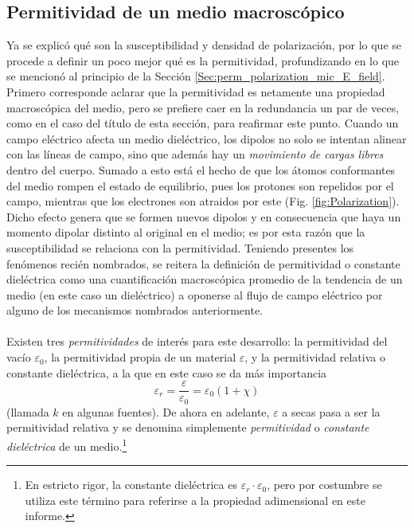 \documentclass[12pt, oneside, numbers, spanish]{ezthesis}
\numberwithin{equation}{section}
\begin{document}
\subsection{Permitividad de un medio macroscópico}\label{subsec:Macro_perm}
Ya se explicó qué son la susceptibilidad y densidad de polarización, por lo que se procede a definir un poco mejor qué es la permitividad, profundizando en lo que se mencionó al principio de la Sección \ref{Sec:perm_polarization_mic_E_field}.
Primero corresponde aclarar que la permitividad es netamente una propiedad macroscópica del medio, pero se prefiere caer en la redundancia un par de veces, como en el caso del título de esta sección, para reafirmar este punto. Cuando un campo eléctrico afecta un medio dieléctrico, los dipolos no solo se intentan alinear con las líneas de campo, sino que además hay un \textit{movimiento de cargas libres} dentro del cuerpo. Sumado a esto está el hecho de que los átomos conformantes del medio rompen el estado de equilibrio, pues los protones son repelidos por el campo, mientras que los electrones son atraidos por este (Fig. \ref{fig:Polarization}). Dicho efecto genera que se formen nuevos dipolos y en consecuencia que haya un momento dipolar distinto al original en el medio; es por esta razón que la susceptibilidad se relaciona con la permitividad. Teniendo presentes los fenómenos recién nombrados, se reitera la definición de permitividad o constante dieléctrica como una cuantificación macroscópica promedio de la tendencia de un medio (en este caso un dieléctrico) a oponerse al flujo de campo eléctrico por alguno de los mecanismos nombrados anteriormente.\\\\
Existen tres \textit{permitividades} de interés para este desarrollo: la permitividad del vacío $\varepsilon_0$, la permitividad propia de un material $\varepsilon$, y la permitividad relativa o constante dieléctrica, a la que en este caso se da más importancia
\begin{equation}\label{eqn:Permittivity_definition}
\varepsilon_r = \frac{\varepsilon}{\varepsilon_0}=\varepsilon_0(1+\chi)
\end{equation}
(llamada $k$ en algunas fuentes). De ahora en adelante, $\varepsilon$ a secas pasa a ser la permitividad relativa y se denomina simplemente \textit{permitividad} o \textit{constante dieléctrica} de un medio.\footnote{En estricto rigor, la constante dieléctrica es $\varepsilon_r\cdot\varepsilon_0$, pero por costumbre se utiliza este término para referirse a la propiedad adimensional en este informe.}
\end{document}
